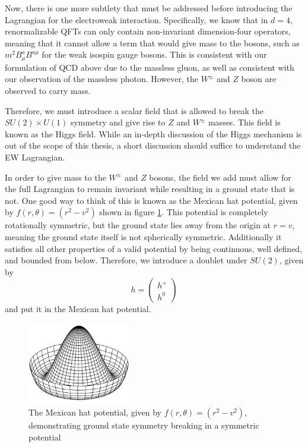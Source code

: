 Now, there is one more subtlety that must be addressed before introducing the Lagrangian for the electroweak interaction. Specifically, we know that in $d=4$, renormalizable QFTs can only contain non-invariant dimension-four operators, meaning that it cannot allow a term that would give mass to the bosons, such as $m^2 B_{\mu}^aB^{a\mu}$ for the weak isospin gauge bosons.  This is consistent with our formulation of QCD above due to the massless gluon, as well as consistent with our observation of the massless photon. However, the $W^\pm$ and $Z$ boson are observed to carry mass.

Therefore, we must introduce a scalar field that is allowed to break the $SU(2) \times U(1)$ symmetry and give rise to $Z$ and $W^\pm$ masses. This field is known as the Higgs field. While an in-depth discussion of the Higgs mechanism is out of the scope of this thesis, a short discussion should suffice to understand the EW Lagrangian.

In order to give mass to the $W^\pm$ and $Z$ bosons, the field we add must allow for the full Lagrangian to remain invariant while resulting in a ground state that is not. One good way to think of this is known as the Mexican hat potential, given by $f(r, \theta) = (r^2 - v^2)$ shown in figure \ref{fig:Mexican_hat_potential}. This potential is completely rotationally symmetric, but the ground state lies away from the origin at $r = v$, meaning the ground state itself is not spherically symmetric. Additionally it satisfies all other properties of a valid potential by being continuous, well defined, and bounded from below. Therefore, we introduce a doublet under $SU(2)$, given by
\begin{equation}
h = \begin{pmatrix}
h^+ \\ h^0
\end{pmatrix}
\end{equation}
and put it in the Mexican hat potential. 

\begin{figure}[ht!]
    \centering
    \includegraphics[width=0.4\textwidth]{figures/chapter2/Mexican_hat_potential.png}
    \caption{The Mexican hat potential, given by $f(r, \theta) = (r^2 - v^2)$, demonstrating ground state symmetry breaking in a symmetric potential}
    \label{fig:Mexican_hat_potential}
\end{figure}

